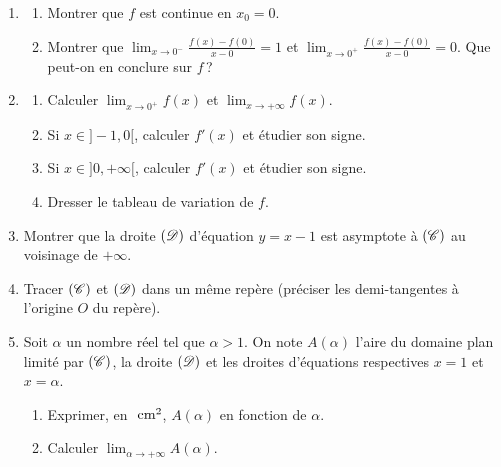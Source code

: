      \begin{enumerate}
            \item \begin{enumerate}
            	            \item Montrer que $f$ est continue en $x_0 = 0$.
            	            \item Montrer que 
            	                  $\displaystyle{
            	                        \lim_{x\rightarrow 0^-} \frac{f(x) - f(0)}{x-0} = 1
            	                  }$
            	                  et
            	                  $\displaystyle{
            	                        \lim_{x\rightarrow 0^+} \frac{f(x) - f(0)}{x-0} = 0
            	                  }$.
            	                  Que peut-on en conclure sur $f$\,?
                  \end{enumerate}
            \item \begin{enumerate}
                        \item Calculer 
            	                  $\displaystyle{ \lim_{x\rightarrow 0^+} f(x) }$ et 
            	                  $\displaystyle{ \lim_{x\rightarrow +\infty} f(x) }$.
            	            \item Si $x \in ]-1 , 0[$, calculer $f'(x)$ et \'etudier son signe.
            	            \item Si $x \in ]0 , +\infty[$, calculer $f'(x)$ et \'etudier son signe.
            	            \item Dresser le tableau de variation de $f$.
                  \end{enumerate}
            \item Montrer que la droite $(\mathscr{D})$ d'\'equation $y = x - 1$ est asymptote \`a $(\mathscr{C})$ au voisinage de $+\infty$.
            \item Tracer $(\mathscr{C})$ et $(\mathscr{D})$ dans un m\^eme rep\`ere 
                  (pr\'eciser les demi-tangentes \`a l'origine $O$ du rep\`ere).
            \item Soit $\alpha$ un nombre r\'eel tel que $\alpha > 1$.
                  On note $A(\alpha)$ l'aire du domaine plan limit\'e par $(\mathscr{C})$, la droite $(\mathscr{D})$ et les droites 
                  d'\'equations respectives $x = 1$ et $x = \alpha$.
                  \begin{enumerate}
                        \item Exprimer, en $~\mathrm{cm}^2$, $A(\alpha)$ en fonction de $\alpha$.
                        \item Calculer $ \displaystyle{ \lim_{\alpha\rightarrow +\infty} A(\alpha) } $.

\end{enumerate}
\end{enumerate}
